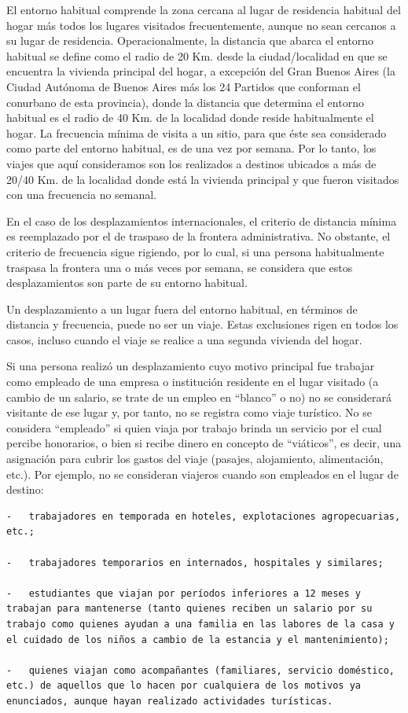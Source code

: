 \documentclass[
  openany]{book}
\begin{document}
El entorno habitual comprende la zona cercana al lugar de residencia habitual del hogar más todos los lugares visitados frecuentemente, aunque no sean cercanos a su lugar de residencia. Operacionalmente, la distancia que abarca el entorno habitual se define como el radio de 20 Km. desde la ciudad/localidad en que se encuentra la vivienda principal del hogar, a excepción del Gran Buenos Aires (la Ciudad Autónoma de Buenos Aires más los 24 Partidos que conforman el conurbano de esta provincia), donde la distancia que determina el entorno habitual es el radio de 40 Km. de la localidad donde reside habitualmente el hogar. La frecuencia mínima de visita a un sitio, para que éste sea considerado como parte del entorno habitual, es de una vez por semana. Por lo tanto, los viajes que aquí consideramos son los realizados a destinos ubicados a más de 20/40 Km. de la localidad donde está la vivienda principal y que fueron visitados con una frecuencia no semanal.

En el caso de los desplazamientos internacionales, el criterio de distancia mínima es reemplazado por el de traspaso de la frontera administrativa. No obstante, el criterio de frecuencia sigue rigiendo, por lo cual, si una persona habitualmente traspasa la frontera una o más veces por semana, se considera que estos desplazamientos son parte de su entorno habitual.

Un desplazamiento a un lugar fuera del entorno habitual, en términos de distancia y frecuencia, puede no ser un viaje. Estas exclusiones rigen en todos los casos, incluso cuando el viaje se realice a una segunda vivienda del hogar.

Si una persona realizó un desplazamiento cuyo motivo principal fue trabajar como empleado de una empresa o institución residente en el lugar visitado (a cambio de un salario, se trate de un empleo en ``blanco'' o no) no se considerará visitante de ese lugar y, por tanto, no se registra como viaje turístico. No se considera ``empleado'' si quien viaja por trabajo brinda un servicio por el cual percibe honorarios, o bien si recibe dinero en concepto de ``viáticos'', es decir, una asignación para cubrir los gastos del viaje (pasajes, alojamiento, alimentación, etc.). Por ejemplo, no se consideran viajeros cuando son empleados en el lugar de destino:

\begin{verbatim}
-   trabajadores en temporada en hoteles, explotaciones agropecuarias, etc.;

-   trabajadores temporarios en internados, hospitales y similares;

-   estudiantes que viajan por períodos inferiores a 12 meses y trabajan para mantenerse (tanto quienes reciben un salario por su trabajo como quienes ayudan a una familia en las labores de la casa y el cuidado de los niños a cambio de la estancia y el mantenimiento);

-   quienes viajan como acompañantes (familiares, servicio doméstico, etc.) de aquellos que lo hacen por cualquiera de los motivos ya enunciados, aunque hayan realizado actividades turísticas.
\end{verbatim}
\end{document}
